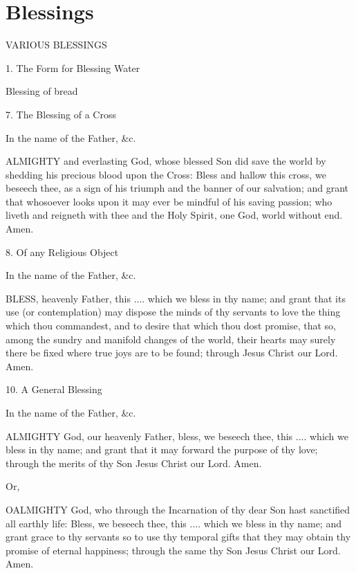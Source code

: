 \chapter{Blessings}

VARIOUS BLESSINGS

1. The Form for Blessing Water

Blessing of bread


7. The Blessing of a Cross

    In the name of the Father, &c.

ALMIGHTY and everlasting God, whose blessed Son did save the world by shedding his precious blood upon the Cross: Bless and hallow this cross, we beseech thee, as a sign of his triumph and the banner of our salvation; and grant that whosoever looks upon it may ever be mindful of his saving passion; who liveth and reigneth with thee and the Holy Spirit, one God, world without end. Amen.

8. Of any Religious Object

    In the name of the Father, &c.

BLESS, heavenly Father, this .... which we bless in thy name; and grant that its use (or contemplation) may dispose the minds of thy servants to love the thing which thou commandest, and to desire that which thou dost promise, that so, among the sundry and manifold changes of the world, their hearts may surely there be fixed where true joys are to be found; through Jesus Christ our Lord. Amen.


10. A General Blessing

    In the name of the Father, &c.

ALMIGHTY God, our heavenly Father, bless, we beseech thee, this .... which we bless in thy name; and grant that it may forward the purpose of thy love; through the merits of thy Son Jesus Christ our Lord. Amen.

Or,

OALMIGHTY God, who through the Incar­nation of thy dear Son hast sanctified all earthly life: Bless, we beseech thee, this .... which we bless in thy name; and grant grace to thy servants so to use thy temporal gifts that they may obtain thy promise of eternal happiness; through the same thy Son Jesus Christ our Lord. Amen.


